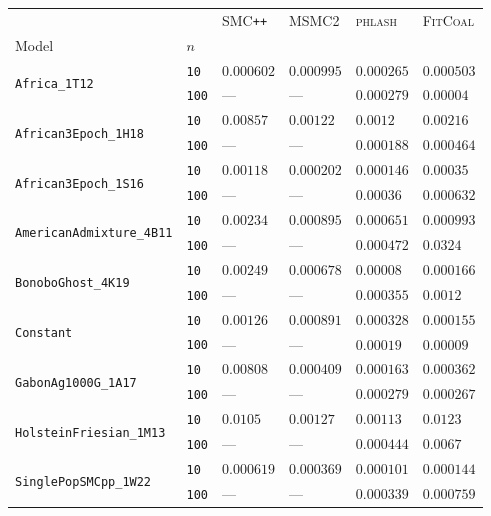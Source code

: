 \begin{footnotesize}
\begin{tabular}{llllll}
\toprule
 &  & \textsc{SMC}\texttt{{++}} & \textsc{MSMC2} & \textsc{phlash} & \textsc{FitCoal} \\
Model & $n$ &  &  &  &  \\
\midrule
\multirow[c]{2}{*}{\texttt{Africa\_1T12}} & \texttt{10} & $0.000602$ & $0.000995$ & $0.000265$ & $0.000503$ \\
 & \texttt{100} & --- & --- & $0.000279$ & $0.00004$ \\
\cline{1-6}
\multirow[c]{2}{*}{\texttt{African3Epoch\_1H18}} & \texttt{10} & $0.00857$ & $0.00122$ & $0.0012$ & $0.00216$ \\
 & \texttt{100} & --- & --- & $0.000188$ & $0.000464$ \\
\cline{1-6}
\multirow[c]{2}{*}{\texttt{African3Epoch\_1S16}} & \texttt{10} & $0.00118$ & $0.000202$ & $0.000146$ & $0.00035$ \\
 & \texttt{100} & --- & --- & $0.00036$ & $0.000632$ \\
\cline{1-6}
\multirow[c]{2}{*}{\texttt{AmericanAdmixture\_4B11}} & \texttt{10} & $0.00234$ & $0.000895$ & $0.000651$ & $0.000993$ \\
 & \texttt{100} & --- & --- & $0.000472$ & $0.0324$ \\
\cline{1-6}
\multirow[c]{2}{*}{\texttt{BonoboGhost\_4K19}} & \texttt{10} & $0.00249$ & $0.000678$ & $0.00008$ & $0.000166$ \\
 & \texttt{100} & --- & --- & $0.000355$ & $0.0012$ \\
\cline{1-6}
\multirow[c]{2}{*}{\texttt{Constant}} & \texttt{10} & $0.00126$ & $0.000891$ & $0.000328$ & $0.000155$ \\
 & \texttt{100} & --- & --- & $0.00019$ & $0.00009$ \\
\cline{1-6}
\multirow[c]{2}{*}{\texttt{GabonAg1000G\_1A17}} & \texttt{10} & $0.00808$ & $0.000409$ & $0.000163$ & $0.000362$ \\
 & \texttt{100} & --- & --- & $0.000279$ & $0.000267$ \\
\cline{1-6}
\multirow[c]{2}{*}{\texttt{HolsteinFriesian\_1M13}} & \texttt{10} & $0.0105$ & $0.00127$ & $0.00113$ & $0.0123$ \\
 & \texttt{100} & --- & --- & $0.000444$ & $0.0067$ \\
\cline{1-6}
\multirow[c]{2}{*}{\texttt{SinglePopSMCpp\_1W22}} & \texttt{10} & $0.000619$ & $0.000369$ & $0.000101$ & $0.000144$ \\
 & \texttt{100} & --- & --- & $0.000339$ & $0.000759$ \\

\end{tabular}
\end{footnotesize}
